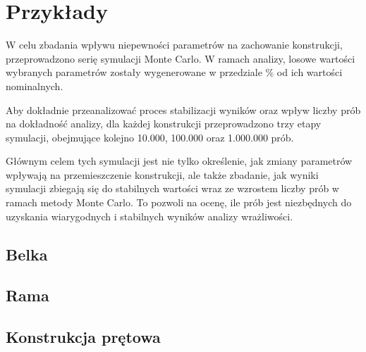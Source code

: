 \section{Przykłady}

W celu zbadania wpływu niepewności parametrów na zachowanie konstrukcji, przeprowadzono serię symulacji Monte Carlo.
W ramach analizy, losowe wartości wybranych parametrów zostały wygenerowane w przedziale \% od ich wartości nominalnych.

Aby dokładnie przeanalizować proces stabilizacji wyników oraz wpływ liczby prób na dokładność analizy,
dla każdej konstrukcji przeprowadzono trzy etapy symulacji, obejmujące kolejno 10.000, 100.000 oraz 1.000.000 prób.

Głównym celem tych symulacji jest nie tylko określenie, jak zmiany parametrów wpływają na przemieszczenie konstrukcji,
ale także zbadanie, jak wyniki symulacji zbiegają się do stabilnych wartości wraz ze wzrostem liczby prób w ramach metody Monte Carlo.
To pozwoli na ocenę, ile prób jest niezbędnych do uzyskania wiarygodnych i stabilnych wyników analizy wrażliwości.

\newpage
\subsection{Belka}


\newpage
\subsection{Rama}


\newpage
\subsection{Konstrukcja prętowa}
